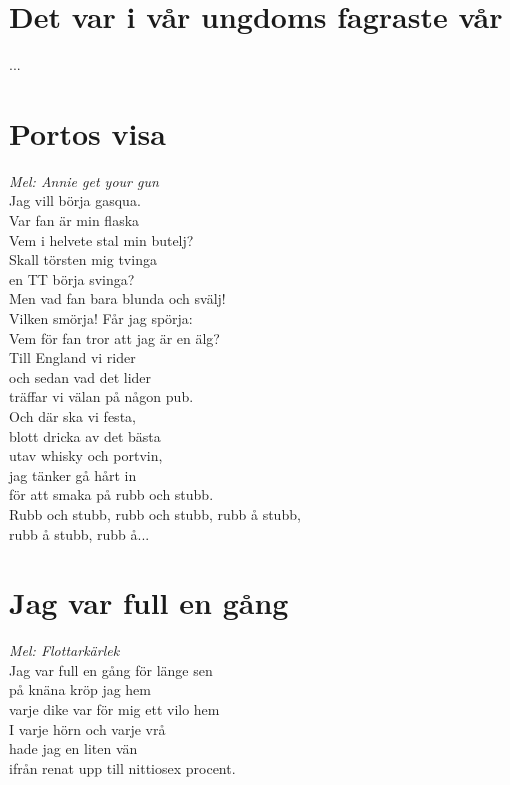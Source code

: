 \documentclass[twoside, openright]{report}
\begin{document}
\section{Det var i vår ungdoms fagraste vår}

...

\section{Portos visa}
\textit{Mel: Annie get your gun}\\

Jag vill börja gasqua.\\
Var fan är min flaska\\
Vem i helvete stal min butelj?\\
Skall törsten mig tvinga\\
en TT börja svinga?\\
Men vad fan bara blunda och svälj!\\
Vilken smörja! Får jag spörja:\\
Vem för fan tror att jag är en älg?\\
Till England vi rider\\
och sedan vad det lider\\
träffar vi välan på någon pub.\\
Och där ska vi festa,\\
blott dricka av det bästa\\
utav whisky och portvin,\\
jag tänker gå hårt in\\
för att smaka på rubb och stubb.\\

Rubb och stubb, rubb och stubb, rubb å stubb,\\
rubb å stubb, rubb å...\\

\section{Jag var full en gång}
\textit{Mel: Flottarkärlek}\\

Jag var full en gång för länge sen\\
på knäna kröp jag hem\\
varje dike var för mig ett vilo hem\\
I varje hörn och varje vrå\\
hade jag en liten vän\\
ifrån renat upp till nittiosex procent.\\
\end{document}
